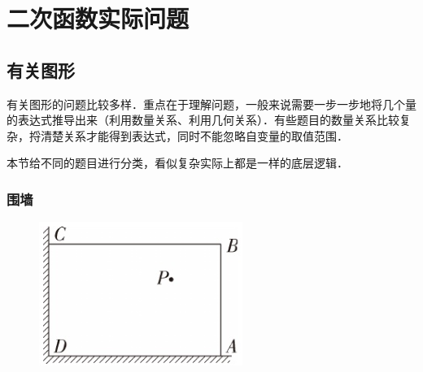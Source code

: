 \section{二次函数实际问题}


\subsection{有关图形}

有关图形的问题比较多样．重点在于理解问题，一般来说需要一步一步地将几个量的表达式推导出来（利用数量关系、利用几何关系）．有些题目的数量关系比较复杂，捋清楚关系才能得到表达式，同时不能忽略自变量的取值范围．

本节给不同的题目进行分类，看似复杂实际上都是一样的底层逻辑．


\subsubsection*{围墙}


\begin{figure}
    \includegraphics[width=1\linewidth]{figure/p1.png}
    \caption{}
    \label{fig:p1}
\end{figure}

